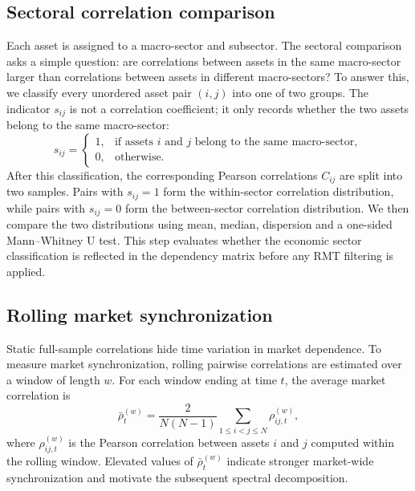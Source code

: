 \subsection{Sectoral correlation comparison}
\label{subsec:sectoral_method}

Each asset is assigned to a macro-sector and subsector. The sectoral comparison asks a simple question: are correlations between assets in the same macro-sector larger than correlations between assets in different macro-sectors? To answer this, we classify every unordered asset pair $(i,j)$ into one of two groups. The indicator $s_{ij}$ is not a correlation coefficient; it only records whether the two assets belong to the same macro-sector:
\begin{equation}
s_{ij}
=
\begin{cases}
1, & \text{if assets } i \text{ and } j \text{ belong to the same macro-sector},\\
0, & \text{otherwise.}
\end{cases}
\end{equation}
After this classification, the corresponding Pearson correlations $C_{ij}$ are split into two samples. Pairs with $s_{ij}=1$ form the within-sector correlation distribution, while pairs with $s_{ij}=0$ form the between-sector correlation distribution. We then compare the two distributions using mean, median, dispersion and a one-sided Mann--Whitney U test. This step evaluates whether the economic sector classification is reflected in the dependency matrix before any RMT filtering is applied.

\subsection{Rolling market synchronization}
\label{subsec:rolling_corr_method}

Static full-sample correlations hide time variation in market dependence. To measure market synchronization, rolling pairwise correlations are estimated over a window of length $w$. For each window ending at time $t$, the average market correlation is
\begin{equation}
\bar{\rho}_t^{(w)}
=
\frac{2}{N(N-1)}
\sum_{1\leq i<j\leq N}
\rho_{ij,t}^{(w)},
\end{equation}
where $\rho_{ij,t}^{(w)}$ is the Pearson correlation between assets $i$ and $j$ computed within the rolling window. Elevated values of $\bar{\rho}_t^{(w)}$ indicate stronger market-wide synchronization and motivate the subsequent spectral decomposition.

